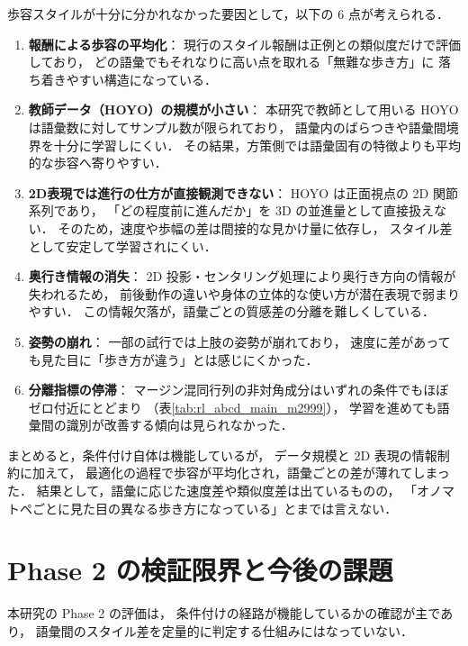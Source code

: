 歩容スタイルが十分に分かれなかった要因として，以下の 6 点が考えられる．
\begin{enumerate}
  \item \textbf{報酬による歩容の平均化}：
        現行のスタイル報酬は正例との類似度だけで評価しており，
        どの語彙でもそれなりに高い点を取れる「無難な歩き方」に
        落ち着きやすい構造になっている．
  \item \textbf{教師データ（HOYO）の規模が小さい}：
        本研究で教師として用いる HOYO は語彙数に対してサンプル数が限られており，
        語彙内のばらつきや語彙間境界を十分に学習しにくい．
        その結果，方策側では語彙固有の特徴よりも平均的な歩容へ寄りやすい．
  \item \textbf{2D表現では進行の仕方が直接観測できない}：
        HOYO は正面視点の 2D 関節系列であり，
        「どの程度前に進んだか」を 3D の並進量として直接扱えない．
        そのため，速度や歩幅の差は間接的な見かけ量に依存し，
        スタイル差として安定して学習されにくい．
  \item \textbf{奥行き情報の消失}：
        2D 投影・センタリング処理により奥行き方向の情報が失われるため，
        前後動作の違いや身体の立体的な使い方が潜在表現で弱まりやすい．
        この情報欠落が，語彙ごとの質感差の分離を難しくしている．
  \item \textbf{姿勢の崩れ}：
        一部の試行では上肢の姿勢が崩れており，
        速度に差があっても見た目に「歩き方が違う」とは感じにくかった．
  \item \textbf{分離指標の停滞}：
        マージン混同行列の非対角成分はいずれの条件でもほぼゼロ付近にとどまり
        （表\ref{tab:rl_abcd_main_m2999}），
        学習を進めても語彙間の識別が改善する傾向は見られなかった．
\end{enumerate}

まとめると，条件付け自体は機能しているが，
データ規模と 2D 表現の情報制約に加えて，
最適化の過程で歩容が平均化され，語彙ごとの差が薄れてしまった．
結果として，語彙に応じた速度差や類似度差は出ているものの，
「オノマトペごとに見た目の異なる歩き方になっている」とまでは言えない．

\section{Phase 2 の検証限界と今後の課題}
\label{sec:phase2_limitations}

本研究の Phase 2 の評価は，
条件付けの経路が機能しているかの確認が主であり，
語彙間のスタイル差を定量的に判定する仕組みにはなっていない．

